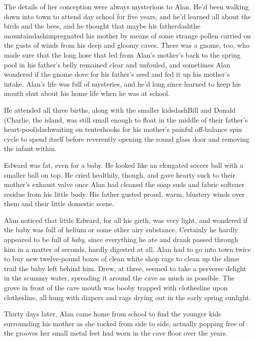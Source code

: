 The details of her conception were always mysterious to Alan.  He'd
been walking down into town to attend day school for five years, and
he'd learned all about the birds and the bees, and he thought that
maybe his fatherdash{}the mountaindash{}impregnated his mother by means of
some strange pollen carried on the gusts of winds from his deep and
gloomy caves.  There was a gnome, too, who made sure that the long
hose that led from Alan's mother's back to the spring pool in his
father's belly remained clear and unfouled, and sometimes Alan
wondered if the gnome dove for his father's seed and fed it up his
mother's intake.  Alan's life was full of mysteries, and he'd long
since learned to keep his mouth shut about his home life when he was
at school.

He attended all three births, along with the smaller kidsdash{}Bill and
Donald (Charlie, the island, was still small enough to float in the
middle of their father's heart-pool)dash{}waiting on tenterhooks for his
mother's painful off-balance spin cycle to spend itself before
reverently opening the round glass door and removing the infant
within.

Edward was fat, even for a baby.  He looked like an elongated soccer
ball with a smaller ball on top.  He cried healthily, though, and gave
hearty suck to their mother's exhaust valve once Alan had cleaned the
soap suds and fabric softener residue from his little body.  His
father gusted proud, warm, blustery winds over them and their little
domestic scene.

Alan noticed that little Edward, for all his girth, was very light,
and wondered if the baby was full of helium or some other airy
substance.  Certainly he hardly appeared to be full of \textit{baby},
since everything he ate and drank passed through him in a matter of
seconds, hardly digested at all.  Alan had to go into town twice to
buy new twelve-pound boxes of clean white shop rags to clean up the
slime trail the baby left behind him.  Drew, at three, seemed to take
a perverse delight in the scummy water, spreading it around the cave
as much as possible.  The grove in front of the cave mouth was booby
trapped with clothesline upon clothesline, all hung with diapers and
rags drying out in the early spring sunlight.

Thirty days later, Alan came home from school to find the younger kids
surrounding his mother as she rocked from side to side, actually
popping free of the grooves her small metal feet had worn in the cave
floor over the years.

